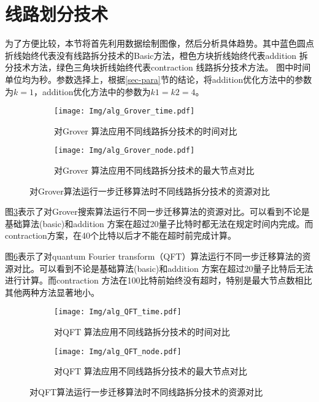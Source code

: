 \section{线路划分技术}
为了方便比较，本节将首先利用数据绘制图像，然后分析具体趋势。其中蓝色圆点折线始终代表没有线路拆分技术的Basic方法，橙色方块折线始终代表addition 拆分技术方法，绿色三角块折线始终代表contraction 线路拆分技术方法。
图中时间单位均为秒。参数选择上，根据\ref{sec-para}节的结论，将addition优化方法中的参数为$k=1$，addition优化方法中的参数为$k1=k2=4$。
\begin{figure}[htbp]
    \centering
    \begin{subfigure}[b]{.45\textwidth}
        \centering
        \texttt{[image: Img/alg\_Grover\_time.pdf]}
        \caption{对Grover 算法应用不同线路拆分技术的时间对比}
        \label{fig:grover-time}
    \end{subfigure}
    \qquad
    \begin{subfigure}[b]{.45\textwidth}
        \centering
        \texttt{[image: Img/alg\_Grover\_node.pdf]}
        \caption{对Grover 算法应用不同线路拆分技术的最大节点对比}
        \label{fig:grover-node}
    \end{subfigure}
    
    \caption{对Grover算法运行一步迁移算法时不同线路拆分技术的资源对比}
    \label{fig:grover-compare}
\end{figure}



图\ref{fig:grover-compare}表示了对Grover搜索算法运行不同一步迁移算法的资源对比。可以看到不论是基础算法(basic)和addition 方案在超过20量子比特时都无法在规定时间内完成。而contraction方案，在40个比特以后才不能在超时前完成计算。


图\ref{fig:QFT-compare}表示了对quantum Fourier transform（QFT）算法运行不同一步迁移算法的资源对比。可以看到不论是基础算法(basic)和addition 方案在超过20量子比特后无法进行计算。而contraction 方法在100比特前始终没有超时，特别是最大节点数相比其他两种方法显著地小。
\begin{figure}[!htbp]
    \centering
    \begin{subfigure}[b]{.45\textwidth}
        \centering
        \texttt{[image: Img/alg\_QFT\_time.pdf]}
        \caption{对QFT 算法应用不同线路拆分技术的时间对比}
        \label{fig:QFT-time}
    \end{subfigure}
    \qquad
    \begin{subfigure}[b]{.45\textwidth}
        \centering
        \texttt{[image: Img/alg\_QFT\_node.pdf]}
        \caption{对QFT 算法应用不同线路拆分技术的最大节点对比}
        \label{fig:QFT-node}
    \end{subfigure}
    \caption{对QFT算法运行一步迁移算法时不同线路拆分技术的资源对比}
    \label{fig:QFT-compare}
\end{figure}

